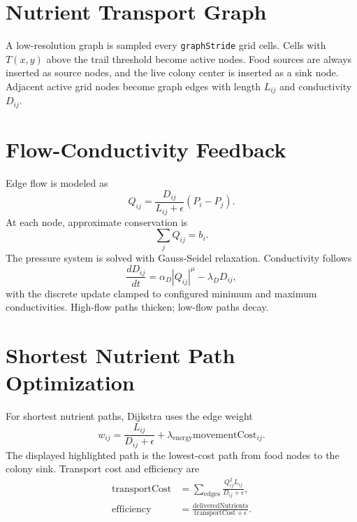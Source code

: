 \documentclass[11pt]{article}
\begin{document}
\section{Nutrient Transport Graph}
A low-resolution graph is sampled every \texttt{graphStride} grid cells. Cells with
$T(x,y)$ above the trail threshold become active nodes. Food sources are always
inserted as source nodes, and the live colony center is inserted as a sink node.
Adjacent active grid nodes become graph edges with length $L_{ij}$ and conductivity
$D_{ij}$.

\section{Flow-Conductivity Feedback}
Edge flow is modeled as
\begin{equation}
\label{eq:flow}
Q_{ij} = \frac{D_{ij}}{L_{ij}+\epsilon}(P_i-P_j).
\end{equation}
At each node, approximate conservation is
\begin{equation}
\label{eq:conservation}
\sum_j Q_{ij} = b_i.
\end{equation}
The pressure system is solved with Gauss-Seidel relaxation. Conductivity follows
\begin{equation}
\label{eq:conductivity-ode}
\frac{dD_{ij}}{dt} = \alpha_D |Q_{ij}|^\mu - \lambda_D D_{ij},
\end{equation}
with the discrete update clamped to configured minimum and maximum conductivities.
High-flow paths thicken; low-flow paths decay.

\section{Shortest Nutrient Path Optimization}
For shortest nutrient paths, Dijkstra uses the edge weight
\begin{equation}
\label{eq:path-weight}
w_{ij} = \frac{L_{ij}}{D_{ij}+\epsilon}
+ \lambda_{\mathrm{energy}}\mathrm{movementCost}_{ij}.
\end{equation}
The displayed highlighted path is the lowest-cost path from food nodes to the
colony sink. Transport cost and efficiency are
\begin{align}
\label{eq:transport-cost}
\mathrm{transportCost} &=
\sum_{\mathrm{edges}} \frac{Q_{ij}^2 L_{ij}}{D_{ij}+\epsilon},\\
\label{eq:efficiency}
\mathrm{efficiency} &=
\frac{\mathrm{deliveredNutrients}}
{\mathrm{transportCost}+\epsilon}.
\end{align}
\end{document}
